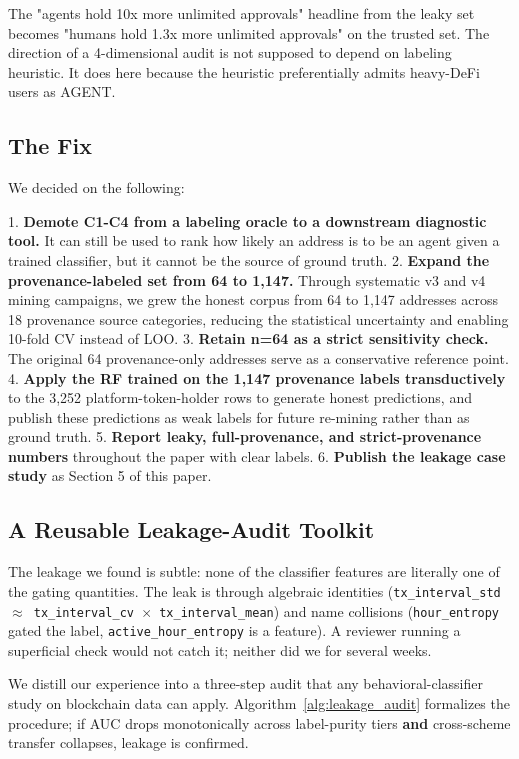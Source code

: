\documentclass[sigconf,nonacm=false]{acmart}
\begin{document}
The "agents hold 10x more unlimited approvals" headline from the leaky set becomes "humans hold 1.3x more unlimited approvals" on the trusted set. The direction of a 4-dimensional audit is not supposed to depend on labeling heuristic. It does here because the heuristic preferentially admits heavy-DeFi users as AGENT.

\subsection{The Fix}

We decided on the following:

1. \textbf{Demote C1-C4 from a labeling oracle to a downstream diagnostic tool.} It can still be used to rank how likely an address is to be an agent given a trained classifier, but it cannot be the source of ground truth.
2. \textbf{Expand the provenance-labeled set from 64 to 1,147.} Through systematic v3 and v4 mining campaigns, we grew the honest corpus from 64 to 1,147 addresses across 18 provenance source categories, reducing the statistical uncertainty and enabling 10-fold CV instead of LOO.
3. \textbf{Retain n=64 as a strict sensitivity check.} The original 64 provenance-only addresses serve as a conservative reference point.
4. \textbf{Apply the RF trained on the 1,147 provenance labels transductively} to the 3,252 platform-token-holder rows to generate honest predictions, and publish these predictions as weak labels for future re-mining rather than as ground truth.
5. \textbf{Report leaky, full-provenance, and strict-provenance numbers} throughout the paper with clear labels.
6. \textbf{Publish the leakage case study} as Section 5 of this paper.

\subsection{A Reusable Leakage-Audit Toolkit}

The leakage we found is subtle: none of the classifier features are literally one of the gating quantities. The leak is through algebraic identities (\texttt{tx\_interval\_std $\approx$ tx\_interval\_cv $\times$ tx\_interval\_mean}) and name collisions (\texttt{hour\_entropy} gated the label, \texttt{active\_hour\_entropy} is a feature). A reviewer running a superficial check would not catch it; neither did we for several weeks.

We distill our experience into a three-step audit that any behavioral-classifier study on blockchain data can apply. Algorithm~\ref{alg:leakage_audit} formalizes the procedure; if AUC drops monotonically across label-purity tiers \textbf{and} cross-scheme transfer collapses, leakage is confirmed.
\end{document}
